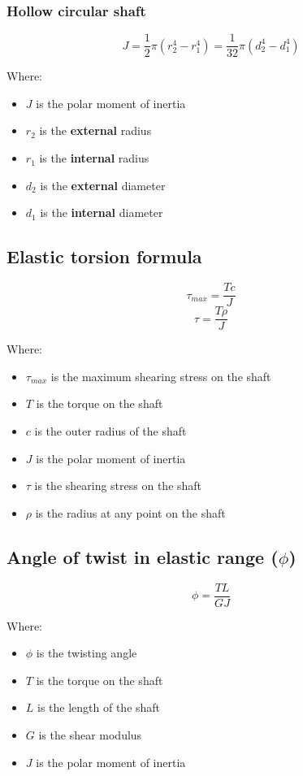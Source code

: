 \documentclass[11pt]{article}
\begin{document}
\subsubsection{Hollow circular shaft}
\label{sec:org85d4e38}
\[J = \frac{1}{2} \pi \left(r_2^4 - r_1^4 \right) = \frac{1}{32} \pi \left(d_2^4 - d_1^4 \right)\]

Where:
\begin{itemize}
\item \(J\) is the polar moment of inertia
\item \(r_2\) is the \textbf{external} radius
\item \(r_1\) is the \textbf{internal} radius
\item \(d_2\) is the \textbf{external} diameter
\item \(d_1\) is the \textbf{internal} diameter
\end{itemize}

\subsection{Elastic torsion formula}
\label{sec:org9ffdaeb}
\[\tau_{max} = \frac{Tc}{J}\]
\[\tau = \frac{T \rho}{J}\]

Where:
\begin{itemize}
\item \(\tau_{max}\) is the maximum shearing stress on the shaft
\item \(T\) is the torque on the shaft
\item \(c\) is the outer radius of the shaft
\item \(J\) is the polar moment of inertia
\item \(\tau\) is the shearing stress on the shaft
\item \(\rho\) is the radius at any point on the shaft
\end{itemize}

\newpage

\subsection{Angle of twist in elastic range (\(\phi\))}
\label{sec:org0e62945}
\[\phi = \frac{TL}{GJ}\]

Where:
\begin{itemize}
\item \(\phi\) is the twisting angle
\item \(T\) is the torque on the shaft
\item \(L\) is the length of the shaft
\item \(G\) is the shear modulus
\item \(J\) is the polar moment of inertia
\end{itemize}
\end{document}
